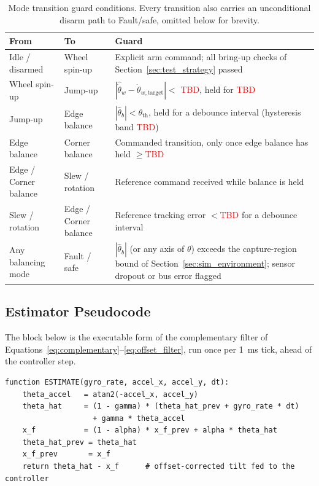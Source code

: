 \begin{table}[htbp]
\centering
\caption[Mode transition guard conditions]{Mode transition guard conditions. Every transition also carries an
unconditional disarm path to Fault/safe, omitted below for brevity.}
\label{tab:state_transitions}
\small
\begin{tabular}{L{2.6cm} L{2.6cm} L{8.2cm}}
\toprule
From & To & Guard \\
\midrule
Idle / disarmed & Wheel spin-up & Explicit arm command; all bring-up checks of Section~\ref{sec:test_strategy} passed \\
Wheel spin-up   & Jump-up       & $|\hat{\dot\theta}_w - \dot\theta_{w,\text{target}}| < $ \textcolor{red}{TBD}, held for \textcolor{red}{TBD} \\
Jump-up         & Edge balance  & $|\hat\theta_b| < \theta_{\text{th}}$, held for a debounce interval (hysteresis band \textcolor{red}{TBD}) \\
Edge balance    & Corner balance & Commanded transition, only once edge balance has held $\geq$\textcolor{red}{TBD} \\
Edge / Corner balance & Slew / rotation & Reference command received while balance is held \\
Slew / rotation & Edge / Corner balance & Reference tracking error $<$\textcolor{red}{TBD} for a debounce interval \\
Any balancing mode & Fault / safe & $|\hat\theta_b|$ (or any axis of $\theta$) exceeds the capture-region bound of Section~\ref{sec:sim_environment}; sensor dropout or bus error flagged \\
\bottomrule
\end{tabular}
\end{table}

\subsection{Estimator Pseudocode}
\label{app:estimator_pseudocode}

The block below is the executable form of the complementary filter of
Equations~\eqref{eq:complementary}--\eqref{eq:offset_filter}, run once per
\qty{1}{\milli\second} tick, ahead of the controller step.

\begin{verbatim}
function ESTIMATE(gyro_rate, accel_x, accel_y, dt):
    theta_accel   = atan2(-accel_x, accel_y)
    theta_hat     = (1 - gamma) * (theta_hat_prev + gyro_rate * dt)
                    + gamma * theta_accel
    x_f           = (1 - alpha) * x_f_prev + alpha * theta_hat
    theta_hat_prev = theta_hat
    x_f_prev       = x_f
    return theta_hat - x_f      # offset-corrected tilt fed to the controller
\end{verbatim}

